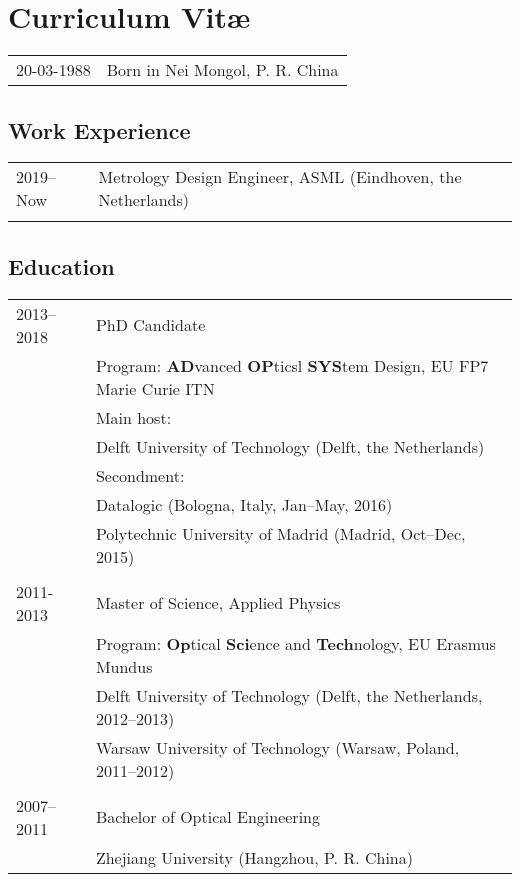 \chapter*{Curriculum Vit\ae}

\makeatletter
\authors{\@firstname\ {\titleshape\@lastname}}
\makeatother

\noindent
\begin{tabular}{p{}l}
    20-03-1988 & Born in Nei Mongol, P. R. China 
\end{tabular}

\section*{Work Experience}
\begin{tabular}{p{}l}
    2019--Now & Metrology Design Engineer, ASML (Eindhoven, the Netherlands) \\

    \\
\end{tabular}

\section*{Education}
\begin{tabular}{p{}l}

    2013--2018 & PhD Candidate \\
    & Program: \textbf{AD}vanced \textbf{OP}ticsl \textbf{SYS}tem Design, EU FP7 Marie Curie ITN\\
    & Main host:\\ 
    & \;Delft University of Technology (Delft, the Netherlands)\\
    & Secondment:\\ 
    & \;\;Datalogic (Bologna, Italy, Jan--May, 2016)\\
    & \;\;Polytechnic University of Madrid (Madrid, Oct--Dec, 2015)\\
    \\
    2011-2013 & Master of Science, Applied Physics \\
    & Program: \textbf{Op}tical \textbf{Sci}ence and \textbf{Tech}nology, EU Erasmus Mundus\\
    & \;\;Delft University of Technology (Delft, the Netherlands, 2012--2013)\\
    &\;\;Warsaw University of Technology (Warsaw, Poland, 2011--2012)\\
    \\
    2007--2011 & Bachelor of Optical Engineering\\
    & Zhejiang University (Hangzhou, P. R. China)
    
\end{tabular}
    

